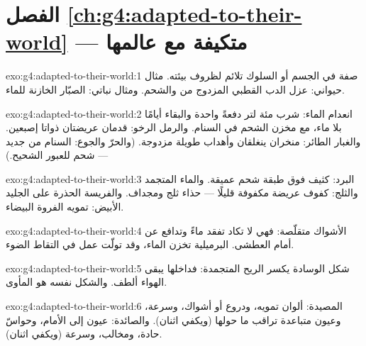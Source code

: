 \section*{الفصل \ref{ch:g4:adapted-to-their-world} --- متكيفة مع عالمها}

\begin{solution}{exo:g4:adapted-to-their-world:1}
صفة في الجسم أو السلوك تلائم  لظروف بيئته. مثال حيواني:
عزل الدب القطبي المزدوج من  والشحم. ومثال نباتي:  الصبّار
الخازنة للماء.
\end{solution}

\begin{solution}{exo:g4:adapted-to-their-world:2}
انعدام الماء: شرب مئة لتر دفعةً واحدة والبقاء أيامًا بلا ماء، مع
مخزن الشحم في السنام. والرمل الرخو: قدمان عريضتان ذواتا إصبعين.
والغبار الطائر: منخران ينغلقان وأهداب طويلة مزدوجة. (والحرّ والجوع:
السنام من جديد --- شحم للعبور الشحيح.)
\end{solution}

\begin{solution}{exo:g4:adapted-to-their-world:3}
البرد:  كثيف فوق طبقة شحم عميقة. والماء المتجمد والثلج: كفوف
عريضة مكفوفة قليلًا --- حذاء ثلج ومجداف. والفريسة الحذرة على الجليد
الأبيض: تمويه الفروة البيضاء.
\end{solution}

\begin{solution}{exo:g4:adapted-to-their-world:4}
الأشواك  متقلّصة: فهي لا تكاد تفقد ماءً وتدافع عن  أمام
 العطشى.  البرميلية تخزن الماء، وقد تولّت عمل
 في التقاط الضوء.
\end{solution}

\begin{solution}{exo:g4:adapted-to-their-world:5}
شكل الوسادة يكسر الريح المتجمدة: فداخلها يبقى الهواء ألطف. والشكل
نفسه هو المأوى.
\end{solution}

\begin{solution}{exo:g4:adapted-to-their-world:6}
المصيدة: ألوان تمويه، ودروع أو أشواك، وسرعة، وعيون متباعدة تراقب
ما حولها (ويكفي اثنان). والصائدة: عيون إلى الأمام، وحواسّ حادة،
ومخالب، وسرعة (ويكفي اثنان).
\end{solution}

